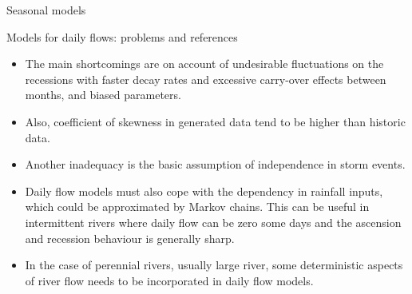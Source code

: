 \documentclass[8pt]{beamer}
\renewcommand{\emph}[1]{\textcolor{myorange}{#1}}
\begin{document}
\begin{frame}{Seasonal models}
    \begin{block}{Models for daily flows: problems and references}
    \end{block}
    \begin{itemize}
        \item The main \emph{shortcomings} are on account of undesirable fluctuations on the \emph{recessions} with faster \emph{decay rates} and excessive carry-over effects between months, and biased parameters. 
        \item Also, \emph{coefficient of skewness} in generated data tend to be higher than historic data.
        \item Another inadequacy is the basic assumption of \emph{independence} in \emph{storm events}. 
        \item \emph{Daily flow models} must also cope with the \emph{dependency} in rainfall inputs, which could be approximated by \emph{Markov chains}. This can be useful in \emph{intermittent rivers}  where daily flow can be zero some days and the \emph{ascension} and \emph{recession} behaviour is generally sharp. 
        \item In the case of \emph{perennial rivers}, usually large river, some deterministic aspects of river flow needs to be incorporated in daily flow models. 
    \end{itemize}
\end{frame}
\end{document}
